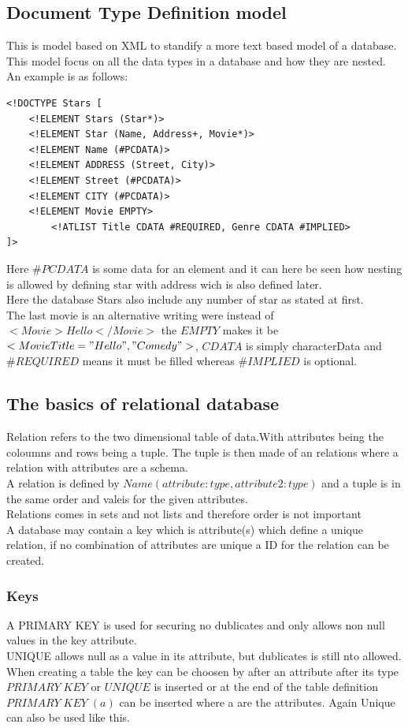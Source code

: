 \documentclass[12pt, a4paper]{article}
\begin{document}
		\subsection{Document Type Definition model}
			This is model based on XML to standify a more text based model of a database. This model focus on all the data types in a database and how they are nested.
			An example is as follows:
			\begin{lstlisting}            
<!DOCTYPE Stars [
	<!ELEMENT Stars (Star*)>
	<!ELEMENT Star (Name, Address+, Movie*)>
	<!ELEMENT Name (#PCDATA)>
	<!ELEMENT ADDRESS (Street, City)>
	<!ELEMENT Street (#PCDATA)>
	<!ELEMENT CITY (#PCDATA)>
	<!ELEMENT Movie EMPTY>
		<!ATLIST Title CDATA #REQUIRED, Genre CDATA #IMPLIED>
]>
		\end{lstlisting}
		Here $\#PCDATA$ is some data for an element and it can here be seen how nesting is allowed by defining star with address wich is also defined later.\\
		Here the database Stars also include any number of star as stated at first.\\
		The last movie is an alternative writing were instead of $<Movie>Hello</Movie>$ the $EMPTY$ makes it be $<Movie Title="Hello", "Comedy">$, $CDATA$ is simply characterData and $\#REQUIRED$ means it must be filled whereas $\#IMPLIED$ is optional.
		\subsection{The basics of relational database}
			Relation refers to the two dimensional table of data.With attributes being the coloumns and rows being a tuple. The tuple is then made of an relations where a relation with attributes are a schema. \\
			A relation is defined by $Name(attribute:type, attribute2: type)$ and a tuple is in the same order and valeis for the given attributes.\\
			Relations comes in sets and not lists and therefore order is not important\\
			A database may contain a key which is attribute(s) which define a unique relation, if no combination of attributes are unique a ID for the relation can be created.
			\subsubsection{Keys}
				A PRIMARY KEY is used for securing no dublicates and only allows non null values in the key attribute.\\
				UNIQUE allows null as a value in its attribute, but dublicates is still nto allowed.\\
				When creating a table the key can be choosen by after an attribute after its type $PRIMARY\; KEY$ or $UNIQUE$ is inserted or at the end of the table definition $PRIMARY\; KEY\; (a)$ can be inserted where a are the attributes. Again Unique can also be used like this.
\end{document}
